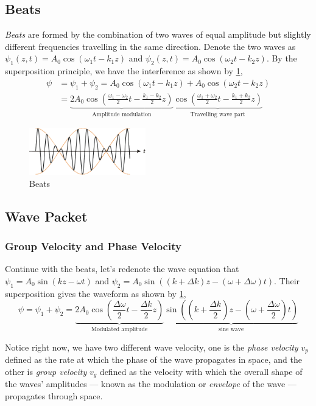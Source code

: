 \documentclass[openany]{book}
\begin{document}
\subsection{Beats}
\emph{Beats} are formed by the combination of two waves of equal amplitude but slightly different frequencies travelling in the same direction. Denote the two waves as $\psi _1(z,t)=A_0\cos (\omega _1t-k_1z)$ and $\psi _2(z,t)=A_0\cos (\omega _2t-k_2z)$. By the superposition principle, we have the interference as shown by \ref{fig:7},
\begin{align*}
\psi &=\psi_1+\psi _2=A_0\cos (\omega _1t-k_1z)+A_0\cos (\omega _2t-k_2z)\\
&=\underbrace{2A_0\cos \left(\frac{\omega _1-\omega _2}{2}t-\frac{k_1-k_2}{2}z\right)}_\text{Amplitude modulation}\underbrace{\cos \left(\frac{\omega _1+\omega _2}{2}t-\frac{k_1+k_2}{2}z\right)}_\text{Travelling wave part}
\end{align*}

\begin{figure}[H]
\centering
\includegraphics[width=0.45\textwidth]{Figure/7.PNG}
\caption{Beats}
\label{fig:7}
\end{figure}

\subsection{Wave Packet}
\subsubsection{Group Velocity and Phase Velocity}
Continue with the beats, let's redenote the wave equation that $\psi _1=A_0\sin (kz-\omega t)$ and $\psi _2=A_0\sin \left((k+\Delta k)z-(\omega +\Delta \omega)t\right)$. Their superposition gives the waveform as shown by \ref{fig:7},
\[\psi =\psi_1+\psi_2=\underbrace{2A_0\cos \left(\frac{\Delta \omega }{2}t-\frac{\Delta k}{2}z\right)}_\text{Modulated
amplitude}\underbrace{\sin \left((k+\frac{\Delta k}{2})z-(\omega +\frac{\Delta \omega }{2})t\right)}_\text{sine wave}\]

Notice right now, we have two different wave velocity, one is the \emph{phase velocity} $v_p$ defined as  the rate at which the phase of the wave propagates in space, and the other is \emph{group velocity} $v_g$ defined as the velocity with which the overall shape of the waves' amplitudes — known as the modulation or \emph{envelope} of the wave — propagates through space.
\end{document}
